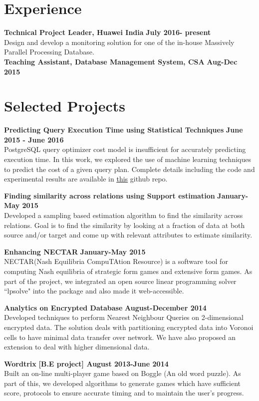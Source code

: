 \documentclass[margin,line]{res}
\begin{document}
\begin{resume}
\section{\sc Experience}
{\bf Technical Project Leader, Huawei India}
\hfill {\bf  July 2016- present  }\\
Design and develop a monitoring solution for one of the in-house Massively Parallel Processing Database. \\
{\bf Teaching Assistant, Database Management System, CSA}
\hfill {\bf  Aug-Dec 2015 }
\section{\sc Selected Projects}
{\bf Predicting Query Execution Time using Statistical Techniques}
\hfill {\bf June 2015  - June 2016}\\
PostgreSQL query optimizer cost model is insufficient for accurately predicting execution time. In this work, we explored the use of machine learning techniques to predict the cost of a given query plan. Complete details including the code and experimental results are available in \underline{\href{http://pvam.github.io/thesis}{this}} github repo.

{\bf Finding similarity across relations using Support estimation}
\hfill {\bf January-May 2015}\\
Developed a sampling based estimation algorithm to find the similarity across relations. Goal is to find the similarity by looking at a fraction of data at both source and/or target and come up with relevant attributes to estimate similarity. 

{\bf Enhancing NECTAR}
\hfill {\bf  January-May 2015}\\
NECTAR(Nash Equilibria CompuTAtion Resource) is a software tool for computing Nash equilibria of strategic form games and extensive form games. As part of the project, we integrated an open source linear programming solver ``lpsolve" into the package and also made it web-accessible.

{\bf Analytics on Encrypted Database}
\hfill {\bf  August-December 2014}\\
Developed techniques to perform Nearest Neighbour Queries on 2-dimensional encrypted data. The solution deals with partitioning encrypted  data into Voronoi cells to have minimal data transfer over network. We have also proposed an extension to deal with higher dimensional data.

{\bf Wordtrix}
\hfill {\bf  [B.E project] August 2013-June 2014}\\
Built an on-line multi-player game based on Boggle (An old word puzzle). As part of this, we developed algorithms to generate games which have sufficient score, protocols to ensure accurate timing and to maintain the user's progress. 


\end{resume}
\end{document}
